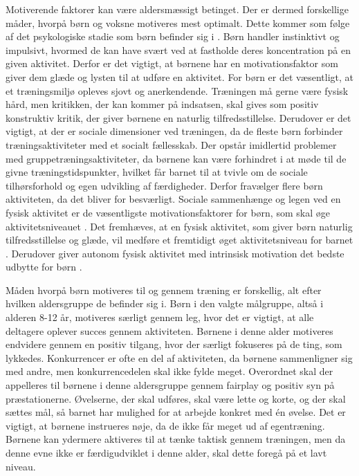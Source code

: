 Motiverende faktorer kan være aldersmæssigt betinget. Der er dermed forskellige måder, hvorpå børn og voksne motiveres mest optimalt. Dette kommer som følge af det psykologiske stadie som børn befinder sig i \citep{V.Brown2007}. Børn handler instinktivt og impulsivt, hvormed de kan have svært ved at fastholde deres koncentration på en given aktivitet. Derfor er det vigtigt, at børnene har en motivationsfaktor som giver dem glæde og lysten til at udføre en aktivitet. \citep{V.Brown2007} \newline
For børn er det væsentligt, at et træningsmiljø opleves sjovt og anerkendende. Træningen må gerne være fysisk hård, men kritikken, der kan kommer på indsatsen, skal gives som positiv konstruktiv kritik, der giver børnene en naturlig tilfredsstillelse. Derudover er det vigtigt, at der er sociale dimensioner ved træningen, da de fleste børn forbinder træningsaktiviteter med et socialt fællesskab. Der opstår imidlertid problemer med gruppetræningsaktiviteter, da børnene kan være forhindret i at møde til de givne træningstidspunkter, hvilket får barnet til at tvivle om de sociale tilhørsforhold og egen udvikling af færdigheder. Derfor fravælger flere børn aktiviteten, da det bliver for besværligt. \citep{Wied2011,Romani2013}\newline
Sociale sammenhænge og legen ved en fysisk aktivitet er de væsentligste motivationsfaktorer for børn, som skal øge aktivitetsniveauet \citep{McWhorter2003,J.Sebire2013}. Det fremhæves, at en fysisk aktivitet, som giver børn naturlig tilfredsstillelse og glæde, vil medføre et fremtidigt øget aktivitetsniveau for barnet \citep{Romani2013}. Derudover giver autonom fysisk aktivitet med intrinsisk motivation det bedste udbytte for børn \citep{J.Sebire2013}.

Måden hvorpå børn motiveres til og gennem træning er forskellig, alt efter hvilken aldersgruppe de befinder sig i. Børn i den valgte målgruppe, altså i alderen 8-12 år, motiveres særligt gennem leg, hvor det er vigtigt, at alle deltagere oplever succes gennem aktiviteten. Børnene i denne alder motiveres endvidere gennem en positiv tilgang, hvor der særligt fokuseres på de ting, som lykkedes. Konkurrencer er ofte en del af aktiviteten, da børnene sammenligner sig med andre, men konkurrencedelen skal ikke fylde meget. Overordnet skal der appelleres til børnene i denne aldersgruppe gennem fairplay og positiv syn på præstationerne. Øvelserne, der skal udføres, skal være lette og korte, og der skal sættes mål, så barnet har mulighed for at arbejde konkret med én øvelse. Det er vigtigt, at børnene instrueres nøje, da de ikke får meget ud af egentræning. Børnene kan ydermere aktiveres til at tænke taktisk gennem træningen, men da denne evne ikke er færdigudviklet i denne alder, skal dette foregå på et lavt niveau. \citep{Wied2011} 

